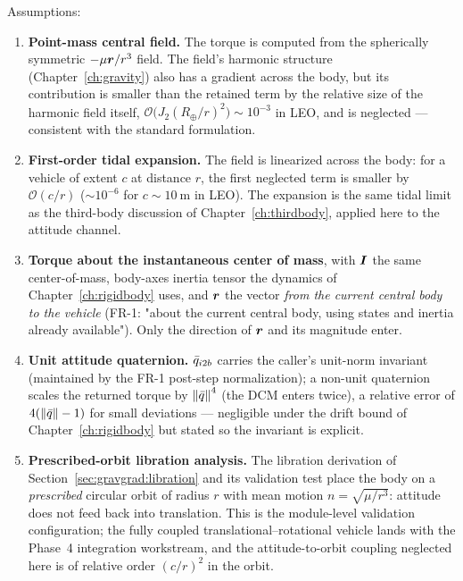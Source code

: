 Assumptions:
\begin{enumerate}
  \item \textbf{Point-mass central field.} The torque is computed from the
    spherically symmetric $-\mu\bm{r}/r^3$ field. The field's harmonic
    structure (Chapter~\ref{ch:gravity}) also has a gradient across the
    body, but its contribution is smaller than the retained term by the
    relative size of the harmonic field itself,
    $\mathcal{O}\bigl(J_2 (R_\oplus/r)^2\bigr) \sim 10^{-3}$ in LEO, and
    is neglected --- consistent with the standard formulation.
  \item \textbf{First-order tidal expansion.} The field is linearized
    across the body: for a vehicle of extent $c$ at distance $r$, the
    first neglected term is smaller by $\mathcal{O}(c/r)$
    ($\sim 10^{-6}$ for $c \sim \qty{10}{\metre}$ in LEO). The expansion
    is the same tidal limit as the third-body discussion of
    Chapter~\ref{ch:thirdbody}, applied here to the attitude channel.
  \item \textbf{Torque about the instantaneous center of mass}, with
    $\bm{I}$ the same center-of-mass, body-axes inertia tensor the
    dynamics of Chapter~\ref{ch:rigidbody} uses, and $\bm{r}$ the vector
    \emph{from the current central body to the vehicle} (FR-1: "about the
    current central body, using states and inertia already available").
    Only the direction of $\bm{r}$ and its magnitude enter.
  \item \textbf{Unit attitude quaternion.} $\bar{q}_{i2b}$ carries the
    caller's unit-norm invariant (maintained by the FR-1 post-step
    normalization); a non-unit quaternion scales the returned torque by
    $\left\lVert \bar{q} \right\rVert^{4}$ (the DCM enters twice), a relative error of
    $4(\left\lVert \bar{q} \right\rVert - 1)$ for small deviations --- negligible under the
    drift bound of Chapter~\ref{ch:rigidbody} but stated so the invariant
    is explicit.
  \item \textbf{Prescribed-orbit libration analysis.} The libration
    derivation of Section~\ref{sec:gravgrad:libration} and its validation
    test place the body on a \emph{prescribed} circular orbit of radius
    $r$ with mean motion $n = \sqrt{\mu/r^3}$: attitude does not feed back
    into translation. This is the module-level validation configuration;
    the fully coupled translational--rotational vehicle lands with the
    Phase~4 integration workstream, and the attitude-to-orbit coupling
    neglected here is of relative order $(c/r)^2$ in the orbit.
\end{enumerate}

